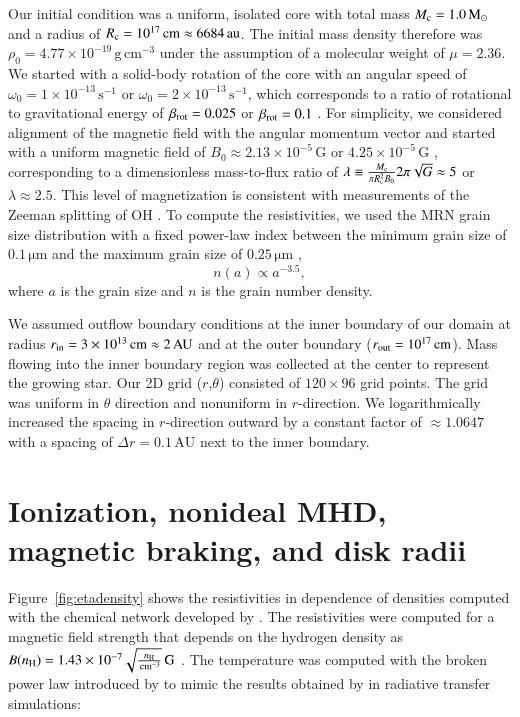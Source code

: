 \documentclass{aa}
\newcommand{\unit}[1]{\ensuremath{\, \mathrm{#1}}}
\newcommand{\Figure}[1]{Figure~\ref{fig:#1}}    %
\begin{document}
Our initial condition was a uniform, isolated core with total mass $M_{\rm c}=1.0 \unit{M}_{\odot}$ and a radius of $R_{\rm c}=10^{17}\unit{cm}\approx 6684 \unit{au}$. 
The initial mass density therefore was $\rho_0 = 4.77\times 10^{-19} \unit{g}\unit{cm}^{-3}$ under the assumption of a molecular weight of $\mu = 2.36$.  
We started with a solid-body rotation of the core with an angular speed of $\omega_0=1\times 10^{-13} \unit{s}^{-1}$ or $\omega_0=2\times 10^{-13} \unit{s}^{-1}$, which corresponds to a ratio of rotational to gravitational energy of $\beta_{\rm rot} = 0.025$ or $\beta_{\rm rot} = 0.1$ \citep{Goodman1993}. 
For simplicity, we considered alignment of the magnetic field with the angular momentum vector and started with a uniform magnetic field of $B_0 \approx 2.13\times 10^{-5} \unit{G}$ or $4.25\times 10^{-5} \unit{G}$ , corresponding to a dimensionless mass-to-flux ratio of $\lambda \equiv \frac{M_{\rm c}}{\pi R_{\rm c}^2 B_0} 2\pi \sqrt{G} \approx 5$ or $\lambda \approx 2.5$.
This level of magnetization is consistent with measurements of the Zeeman splitting of OH \citep{TrolandCrutcher2008}.
To compute the resistivities, we used the MRN \citep[Mathis-Rumpl-Nordsieck][]{MRN1977} grain size distribution with a fixed power-law index between the minimum grain size of $0.1 \unit{\mu m}$ and the maximum grain size of $0.25 \unit{\mu m}$ \citep{Zhao2016},
\begin{equation}
     n(a) \propto a^{-3.5}, 
\end{equation}
where $a$ is the grain size and $n$ is the grain number density.


We assumed outflow boundary conditions at the inner boundary of our domain at radius $r_{\rm in}=3\times 10^{13}\unit{cm}\approx2 \unit{AU}$ and at the outer boundary ($r_{\rm out}=10^{17}\unit{cm}$).
Mass flowing into the inner boundary region was collected at the center to represent the growing star.
Our 2D grid ($r$,$\theta$) consisted of $120\times96$ grid points. The grid was uniform in $\theta$ direction and nonuniform in $r$-direction. We logarithmically increased the spacing in $r$-direction outward by a constant factor of $\approx 1.0647$ with a spacing of $\Delta r =0.1 \unit{AU}$ next to the inner boundary.

\section{Ionization, nonideal MHD, magnetic braking, and disk radii}
\Figure{etadensity} shows the resistivities in dependence of densities computed with the chemical network developed by \citet{Zhao2016}. The resistivities were computed for a magnetic field strength that depends on the hydrogen density as $B(n_{\rm H}) = 1.43\times 10^{-7} \sqrt{ \frac{n_{\rm H}}{\unit{cm}^{-3}}}\unit{G}$ \citep{Nakano2002,Li2011}. The temperature was computed with the broken power law introduced by \citet{Zhao2018} to mimic the results obtained by \citet{Tomida2013} in radiative transfer simulations:
\end{document}
